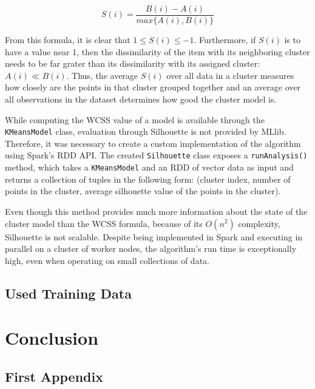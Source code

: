 \documentclass{l4proj}
\begin{document}
$$S(i) = \frac{B(i) - A(i)}{max\{A(i), B(i)\}}$$

From this formula, it is clear that $1 \leq S(i) \leq -1$. Furthermore, if $S(i)$ is to have a value near 1, then the dissimilarity of the item with its neighboring cluster needs to be far grater than its dissimilarity with its assigned cluster: $A(i) \ll B(i)$. Thus, the average $S(i)$ over all data in a cluster measures how closely are the points in that cluster grouped together and an average over all observations in the dataset determines how good the cluster model is.

While computing the WCSS value of a model is available through the \texttt{KMeansModel} class, evaluation through Silhouette is not provided by MLlib. Therefore, it was necessary to create a custom implementation of the algorithm using Spark's RDD API. The created \texttt{Silhouette} class exposes a \texttt{runAnalysis()} method, which takes a \texttt{KMeansModel} and an RDD of vector data as input and returns a collection of tuples in the following form: (cluster index, number of points in the cluster, average silhouette value of the points in the cluster).

Even though this method provides much more information about the state of the cluster model than the WCSS formula, because of its $O(n^2)$ complexity, Silhouette is not scalable. Despite being implemented in Spark and executing in parallel on a cluster of worker nodes, the algorithm's run time is exceptionally high, even when operating on small collections of data.

\section{Used Training Data}





\chapter{Conclusion}
\label{conclusion}







\begin{appendices}

\chapter{First Appendix}

\end{appendices}
\end{document}
